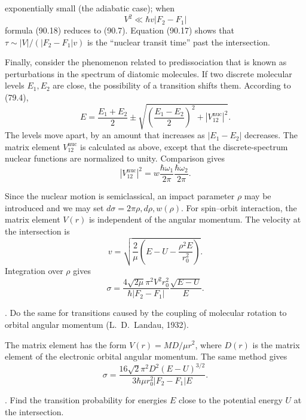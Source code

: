 exponentially small (the adiabatic case); when
\begin{equation}V^2\ll\hbar v|F_2-F_1|\tag{90.19}\end{equation}
formula (90.18) reduces to (90.7). Equation (90.17) shows that $\tau\sim|V|/(|F_2-F_1|v)$ is the ``nuclear transit time'' past the intersection.

Finally, consider the phenomenon related to predissociation that is known as perturbations in the spectrum of diatomic molecules. If two discrete molecular levels $E_1,E_2$ are close, the possibility of a transition shifts them. According to (79.4),
\begin{equation}E=\frac{E_1+E_2}{2}\pm\sqrt{\left(\frac{E_1-E_2}{2}\right)^2+|V_{12}^{\text{nuc}}|^2}.\tag{90.20}\end{equation}
The levels move apart, by an amount that increases as $|E_1-E_2|$ decreases. The matrix element $V_{12}^{\text{nuc}}$ is calculated as above, except that the discrete-spectrum nuclear functions are normalized to unity. Comparison gives
\begin{equation}|V_{12}^{\text{nuc}}|^2=w\frac{\hbar\omega_1}{2\pi}\frac{\hbar\omega_2}{2\pi}.\tag{90.21}\end{equation}



\SolutionHeading Since the nuclear motion is semiclassical, an impact parameter $\rho$ may be introduced and we may set $d\sigma=2\pi\rho,d\rho,w(\rho)$. For spin--orbit interaction, the matrix element $V(r)$ is independent of the angular momentum. The velocity at the intersection is
\[
v=\sqrt{\frac2\mu\left(E-U-\frac{\rho^2E}{r_0^2}\right)}.
\]
Integration over $\rho$ gives
\[
\sigma=\frac{4\sqrt{2\mu}\pi^2V^2r_0^2}{\hbar|F_2-F_1|}\frac{\sqrt{E-U}}{E}.
\]

. Do the same for transitions caused by the coupling of molecular rotation to orbital angular momentum (L.~D.~Landau, 1932).

\SolutionHeading The matrix element has the form $V(r)=MD/\mu r^2$, where $D(r)$ is the matrix element of the electronic orbital angular momentum. The same method gives
\[
\sigma=\frac{16\sqrt2\pi^2D^2(E-U)^{3/2}}{3\hbar\mu r_0^2|F_2-F_1|E}.
\]

. Find the transition probability for energies $E$ close to the potential energy $U$ at the intersection.


